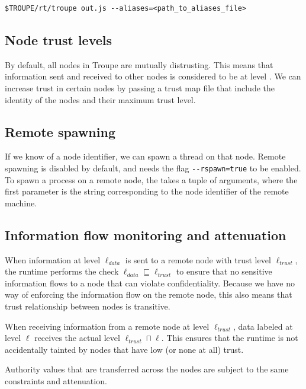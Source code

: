 \begin{verbatim}
$TROUPE/rt/troupe out.js --aliases=<path_to_aliases_file>
\end{verbatim}


\subsection{Node trust levels}

By default, all nodes in Troupe are mutually distrusting. This means that
information sent and received to other nodes is considered to be at level \lev{}.
We can increase trust in certain nodes by
passing a trust map file that include the identity of the nodes and their maximum
trust level.


\subsection{Remote spawning}
If we know of a node identifier, we can spawn a thread on that node. Remote spawning is
disabled by default, and needs the flag {\verb|--rspawn=true|} to be enabled.
%
To spawn a process on a remote node, the  takes a tuple of arguments,
where the first parameter is the string corresponding to the node identifier of the remote machine.


\subsection{Information flow monitoring and attenuation}
When information at level $\ell_{\mathit{data}}$ is sent to a remote node with trust level
$\ell_{\mathit{trust}}$, the runtime performs the check
$\ell_{\mathit{data}} \sqsubseteq \ell_{\mathit{trust}}$ to ensure that no sensitive information
flows to a node that can violate confidentiality. Because we have no way of enforcing the
information flow on the remote node, this also means that
trust relationship between nodes is transitive.

When receiving information from a remote node at level $\ell_{\mathit{trust}}$,
data labeled at level $\ell$ receives the actual level $\ell_{\mathit{trust}} \sqcap \ell$.
This ensures that the runtime is not accidentally tainted by nodes that have low (or none at all) trust.

Authority values that are transferred across the nodes are subject to the same constraints and attenuation.


\clearpage
\appendix


